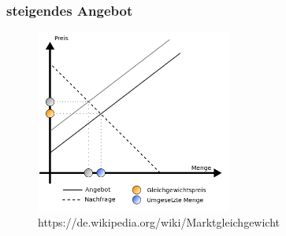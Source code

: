 \documentclass{beamer}
\begin{document}
\begin{frame}
\frametitle{steigendes Angebot}
  \begin{figure}[h]
    \centering
    \includegraphics[height=6cm]{steigendes_angebot}
    \caption{https://de.wikipedia.org/wiki/Marktgleichgewicht}
  \end{figure}
\end{frame}
\end{document}
